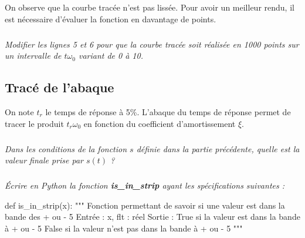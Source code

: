 \documentclass[10pt]{article}
\newif\ifprof
\begin{document}
On observe que la courbe tracée n'est pas lissée. Pour avoir un meilleur rendu, il est nécessaire d'évaluer la fonction en davantage de points. 

\subparagraph{}
\textit{Modifier les lignes 5 et 6 pour que la courbe tracée soit réalisée en 1000 points sur un intervalle de $t \omega_0$ variant de 0 à 10. }

\ifprof
\begin{corrige}
\begin{py}
\begin{python}
def trace_s(z):
    x = []
    y = []
    n = 1000
    for i in range(n+1):
        t = 10*i/n
        x.append(t)
        y.append(f_s(t,z))
    plot(x,y)
\end{python}
\end{py}
\end{corrige}
\else
\fi

\subsection*{Tracé de l'abaque}

On note $t_r$  le temps de réponse à 5\%. L'abaque du temps de réponse permet de tracer le produit $t_r\omega_0$ en fonction du coefficient d'amortissement $\xi$.

\subparagraph{}
\textit{Dans les conditions de la fonction $s$ définie dans la partie précédente, quelle est la valeur finale prise par $s(t)$ ?} 
\ifprof
\begin{corrige}
La valeur finale est 1. 
\end{corrige}
\else
\fi

\subparagraph{}
\textit{Écrire en Python la fonction \textsf{\textbf{is\_in\_strip}} ayant les spécifications suivantes : } 

\begin{py}
\begin{python}
def is_in_strip(x):
    """
    Fonction permettant de savoir si une valeur est dans la bande des + ou - 5%
    Entrée : 
        x, flt : réel
    Sortie : 
        True si la valeur est dans la bande à + ou - 5%
        False si la valeur n'est pas dans la bande à + ou - 5%
    """
\end{python}
\end{py}

\ifprof
\begin{corrige}
\begin{py}
\begin{python}
def trace_s(z):
    x = []
    y = []
    n = 1000
    for i in range(n+1):
        t = 10*i/n
        x.append(t)
        y.append(f_s(t,z))
    plot(x,y)
\end{python}
\end{py}
\end{corrige}
\else
\fi
\end{document}
